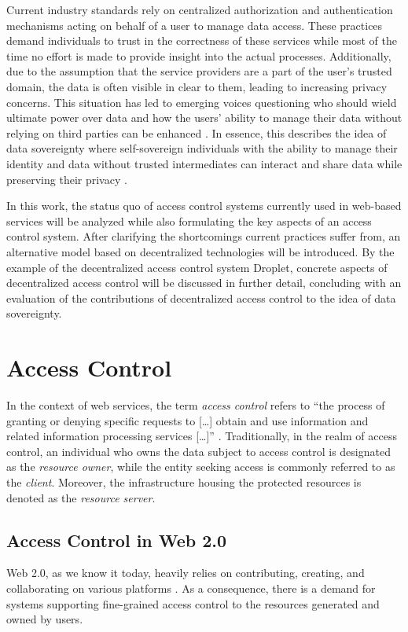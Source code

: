 \documentclass[conference]{IEEEtran}
\begin{document}
Current industry standards rely on centralized authorization and authentication mechanisms acting on behalf of a user to manage data access. \cite{hardt_oauth_2012,noauthor_googles_nodate}
These practices demand individuals to trust in the correctness of these services while most of the time no effort is made to provide insight into the actual processes.
Additionally, due to the assumption that the service providers are a part of the user's trusted domain, the data is often visible in clear to them, leading to increasing privacy concerns.
This situation has led to emerging voices questioning who should wield ultimate power over data and how the users' ability to manage their data without relying on third parties can be enhanced \cite{noauthor_w3f_nodate}.
In essence, this describes the idea of data sovereignty where self-sovereign individuals with the ability to manage their identity and data without trusted intermediates can interact and share data while preserving their privacy \cite{ernstberger_sok_2023}.

In this work, the status quo of access control systems currently used in web-based services will be analyzed while also formulating the key aspects of an access control system.
After clarifying the shortcomings current practices suffer from, an alternative model based on decentralized technologies will be introduced.
By the example of the decentralized access control system Droplet, concrete aspects of decentralized access control will be discussed in further detail, concluding with an evaluation of the contributions of decentralized access control to the idea of data sovereignty.

\section{Access Control}
In the context of web services, the term \textit{access control} refers to \enquote{the process of granting or denying specific requests to [\dots] obtain and use information and related information processing services [\dots]} \cite{editor_access_nodate}.
Traditionally, in the realm of access control, an individual who owns the data subject to access control is designated as the \textit{resource owner}, while the entity seeking access is commonly referred to as the \textit{client}.
Moreover, the infrastructure housing the protected resources is denoted as the \textit{resource server}.

\subsection{Access Control in Web 2.0}
Web 2.0, as we know it today, heavily relies on contributing, creating, and collaborating on various platforms \cite{community_web_2019}.
As a consequence, there is a demand for systems supporting fine-grained access control to the resources generated and owned by users.
\end{document}
